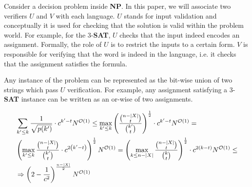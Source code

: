 \documentclass[manuscript,screen,review]{acmart}
\begin{document}
Consider a decision problem inside \textbf{NP}. In this paper, we will associate two verifiers $U$ and $V$ with each language. $U$ stands for input validation and conceptually it is used for checking that the solution is valid within the problem world. For example, for the $3$-\textbf{SAT}, $U$ checks that the input indeed encodes an assignment. Formally, the role of $U$ is to restrict the inputs to a certain form. $V$ is responsible for verifying that the word is indeed in the language, i.e. it checks that the assignment satisfies the formula.


Any instance of the problem can be represented as the bit-wise union of two strings which pass $U$ verification. For example, any assignment satisfying a  $3$-\textbf{SAT} instance can be written as an or-wise of two assignments.


\begin{equation*}
  \begin{split}    
    & \sum_{k' \leq k}   \frac{1}{ \sqrt{ p(k') } } \cdot c^{k'-t} N^{{\mathcal{O}}(1)} \leq  \max_{k' \leq k} \left( \frac{{n - |X| \choose t}}{{k' \choose t}} \right)^{\frac{1}{2}} \cdot c^{k'-t} N^{{\mathcal{O}}(1)} = \\ 
    & \left( \max_{k' \leq k} \frac{{n - |X| \choose t}}{{k' \choose t}}  \cdot c^{2 \left( k'-t \right) } \right)^{\frac{1}{2}} N^{{\mathcal{O}}(1) } =  \left( \max_{k \leq n-|X|} \frac{{n - |X| \choose t}}{{k \choose t}} \right)^{\frac{1}{2}} \cdot c^{ 2 \left(  k-t \right) } N^{{\mathcal{O}}(1)} \le \\ 
    & \Rightarrow  \left(2-\frac{1}{c^{2}}\right)^{ \frac{ n-|X|}{2} }N^{{\mathcal{O}}(1)}
  \end{split}
\end{equation*}


\end{document}
